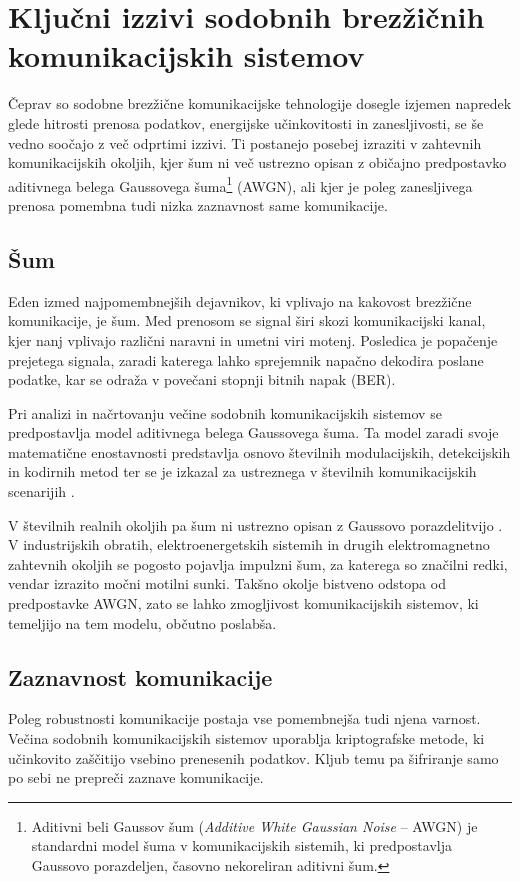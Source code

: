\documentclass[a4paper, 12pt, openany]{book}
\begin{document}
\section{Ključni izzivi sodobnih brezžičnih komunikacijskih sistemov}
Čeprav so sodobne brezžične komunikacijske tehnologije dosegle izjemen napredek glede hitrosti prenosa podatkov, energijske učinkovitosti in zanesljivosti, se še vedno soočajo z več odprtimi izzivi. Ti postanejo posebej izraziti v zahtevnih komunikacijskih okoljih, kjer šum ni več ustrezno opisan z običajno predpostavko aditivnega belega Gaussovega šuma\footnote{Aditivni beli Gaussov šum (\textit{Additive White Gaussian Noise} --  AWGN) je standardni model šuma v komunikacijskih sistemih, ki predpostavlja Gaussovo porazdeljen, časovno nekoreliran aditivni šum.} (AWGN), ali kjer je poleg zanesljivega prenosa pomembna tudi nizka zaznavnost same komunikacije.

\subsection{Šum}
Eden izmed najpomembnejših dejavnikov, ki vplivajo na kakovost brezžične komunikacije, je šum. Med prenosom se signal širi skozi komunikacijski kanal, kjer nanj vplivajo različni naravni in umetni viri motenj. Posledica je popačenje prejetega signala, zaradi katerega lahko sprejemnik napačno dekodira poslane podatke, kar se odraža v povečani stopnji bitnih napak (BER).

Pri analizi in načrtovanju večine sodobnih komunikacijskih sistemov se predpostavlja model aditivnega belega Gaussovega šuma. Ta model zaradi svoje matematične enostavnosti predstavlja osnovo številnih modulacijskih, detekcijskih in kodirnih metod ter se je izkazal za ustreznega v številnih komunikacijskih scenarijih \cite{wikiAWGN}\cite{iblAWGN}.

V številnih realnih okoljih pa šum ni ustrezno opisan z Gaussovo porazdelitvijo \cite{madi2011impacts}. V industrijskih obratih, elektroenergetskih sistemih in drugih elektromagnetno zahtevnih okoljih se pogosto pojavlja impulzni šum, za katerega so značilni redki, vendar izrazito močni motilni sunki. Takšno okolje bistveno odstopa od predpostavke AWGN, zato se lahko zmogljivost komunikacijskih sistemov, ki temeljijo na tem modelu, občutno poslabša.

\subsection{Zaznavnost komunikacije}
Poleg robustnosti komunikacije postaja vse pomembnejša tudi njena varnost. Večina sodobnih komunikacijskih sistemov uporablja kriptografske metode, ki učinkovito zaščitijo vsebino prenesenih podatkov. Kljub temu pa šifriranje samo po sebi ne prepreči zaznave komunikacije.
\end{document}
